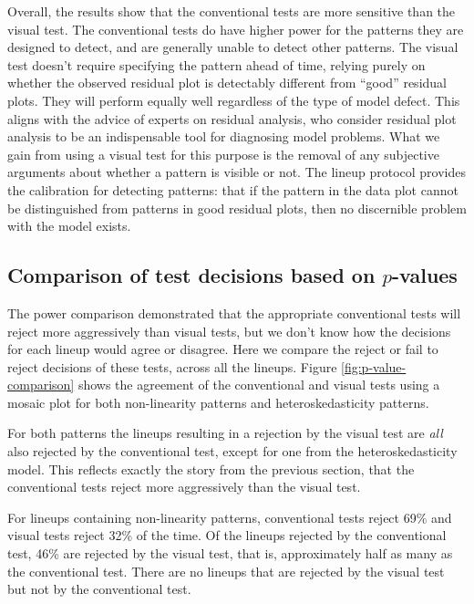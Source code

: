 \documentclass[]{interact}
\theoremstyle{plain}%
\theoremstyle{definition}
\theoremstyle{remark}
\begin{document}
Overall, the results show that the conventional tests are more sensitive
than the visual test. The conventional tests do have higher power for
the patterns they are designed to detect, and are generally unable to
detect other patterns. The visual test doesn't require specifying the
pattern ahead of time, relying purely on whether the observed residual
plot is detectably different from ``good'' residual plots. They will
perform equally well regardless of the type of model defect. This aligns
with the advice of experts on residual analysis, who consider residual
plot analysis to be an indispensable tool for diagnosing model problems.
What we gain from using a visual test for this purpose is the removal of
any subjective arguments about whether a pattern is visible or not. The
lineup protocol provides the calibration for detecting patterns: that if
the pattern in the data plot cannot be distinguished from patterns in
good residual plots, then no discernible problem with the model exists.

\hypertarget{comparison-of-test-decisions-based-on-p-values}{%
\subsection{\texorpdfstring{Comparison of test decisions based on
\(p\)-values\label{p-value}}{Comparison of test decisions based on p-values}}\label{comparison-of-test-decisions-based-on-p-values}}

The power comparison demonstrated that the appropriate conventional
tests will reject more aggressively than visual tests, but we don't know
how the decisions for each lineup would agree or disagree. Here we
compare the reject or fail to reject decisions of these tests, across
all the lineups. Figure \ref{fig:p-value-comparison} shows the agreement
of the conventional and visual tests using a mosaic plot for both
non-linearity patterns and heteroskedasticity patterns.

For both patterns the lineups resulting in a rejection by the visual
test are \emph{all} also rejected by the conventional test, except for
one from the heteroskedasticity model. This reflects exactly the story
from the previous section, that the conventional tests reject more
aggressively than the visual test.

For lineups containing non-linearity patterns, conventional tests reject
69\% and visual tests reject 32\% of the time. Of the lineups rejected
by the conventional test, 46\% are rejected by the visual test, that is,
approximately half as many as the conventional test. There are no
lineups that are rejected by the visual test but not by the conventional
test.
\end{document}
